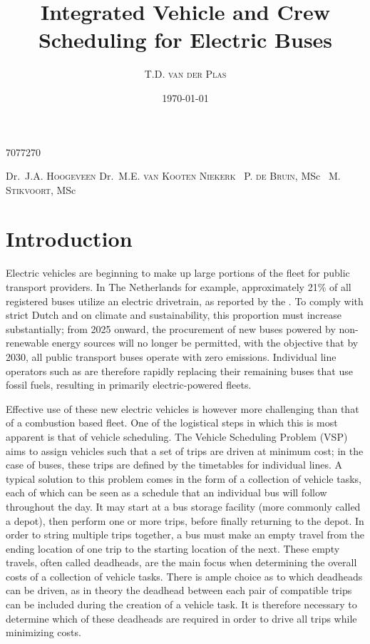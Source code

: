 \documentclass[]{article}
\begin{document}
\title{Integrated Vehicle and Crew Scheduling for Electric Buses}
\author
    {T.D. \textsc{van der Plas}} %
    {7077270}           %
\date{\today}

\supervisors
    {Dr.~J.A. \textsc{Hoogeveen}} %
    {Dr.~M.E. \textsc{van Kooten Niekerk}} %
    {~P. \textsc{de Bruin}, MSc} %
    {~M. \textsc{Stikvoort}, MSc} %



\section{Introduction}
Electric vehicles are beginning to make up large portions of the fleet for public transport providers. In The Netherlands for example, approximately 21\% of all registered buses utilize an electric drivetrain, as reported by the \citet{RDW}. To comply with strict Dutch and \citet{europaRegulation20181999} on climate and sustainability, this proportion must increase substantially; from 2025 onward, the procurement of new buses powered by non-renewable energy sources will no longer be permitted, with the objective that by 2030, all public transport buses operate with zero emissions. Individual line operators such as \citet{qbuzzQbuzz} are therefore rapidly replacing their remaining buses that use fossil fuels, resulting in primarily electric-powered fleets.

Effective use of these new electric vehicles is however more challenging than that of a combustion based fleet. One of the logistical steps in which this is most apparent is that of vehicle scheduling. The Vehicle Scheduling Problem (VSP) aims to assign vehicles such that a set of trips are driven at minimum cost; in the case of buses, these trips are defined by the timetables for individual lines. A typical solution to this problem comes in the form of a collection of vehicle tasks, each of which can be seen as a schedule that an individual bus will follow throughout the day. It may start at a bus storage facility (more commonly called a depot), then perform one or more trips, before finally returning to the depot. In order to string multiple trips together, a bus must make an empty travel from the ending location of one trip to the starting location of the next. These empty travels, often called deadheads, are the main focus when determining the overall costs of a collection of vehicle tasks. There is ample choice as to which deadheads can be driven, as in theory the deadhead between each pair of compatible trips can be included during the creation of a vehicle task. It is therefore necessary to determine which of these deadheads are required in order to drive all trips while minimizing costs.
\end{document}
